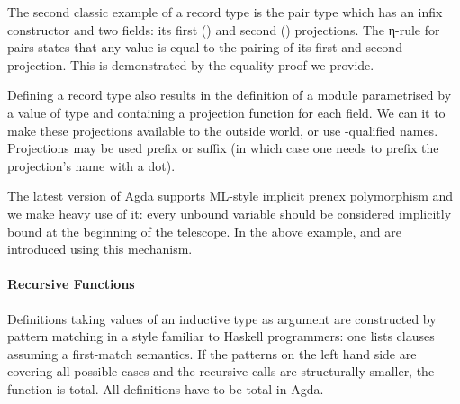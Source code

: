 The second classic example of a record type is the pair type  which
has an infix constructor \AIC{\_,\_} and two fields: its first () and
second () projections. The η-rule for pairs states that any value is
equal to the pairing of its first and second projection. This is demonstrated
by the equality proof we provide.


\begin{minipage}[t]{0.5\textwidth}
\end{minipage}
\begin{minipage}[t]{0.5\textwidth}
\end{minipage}

Defining a record type  also results in the definition of a module 
parametrised by a value of type  and containing a projection function
for each field. We can  it to make these projections available to the
outside world, or use -qualified names. Projections may be used prefix
or suffix (in which case one needs to prefix the projection's name with a dot).

\begin{minipage}{0.5\textwidth}
\end{minipage}
\begin{minipage}{0.5\textwidth}
\end{minipage}

\begin{feature} The latest version of Agda supports ML-style
implicit prenex polymorphism and we make heavy use of it: every unbound variable
should be considered implicitly bound at the beginning of the telescope. In the above
example,  and  are introduced using this mechanism.
\end{feature}

\paragraph{Recursive Functions}

Definitions taking values of an inductive type as argument are constructed by
pattern matching in a style familiar to Haskell programmers: one lists
clauses assuming a first-match semantics. If the patterns on the left hand
side are covering all possible cases and the recursive calls are structurally
smaller, the function is total. All definitions have to be total in Agda.


